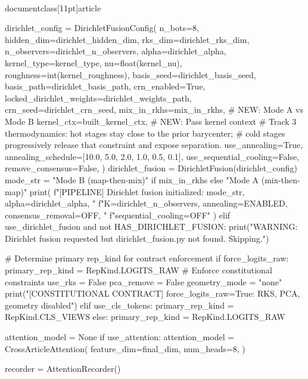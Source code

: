 \\documentclass[11pt]{article}
\begin{document}
\begin{CodeBlock}
        dirichlet_config = DirichletFusionConfig(
            n_bots=8,
            hidden_dim=dirichlet_hidden_dim,
            rks_dim=dirichlet_rks_dim,
            n_observers=dirichlet_n_observers,
            alpha=dirichlet_alpha,
            kernel_type=kernel_type,
            nu=float(kernel_nu),
            roughness=int(kernel_roughness),
            basis_seed=dirichlet_basis_seed,
            basis_path=dirichlet_basis_path,
            crn_enabled=True,
            locked_dirichlet_weights=dirichlet_weights_path,
            crn_seed=dirichlet_crn_seed,
            mix_in_rkhs=mix_in_rkhs,  # NEW: Mode A vs Mode B
            kernel_ctx=built_kernel_ctx,  # NEW: Pass kernel context
            # Track 3 thermodynamics: hot stages stay close to the prior barycenter;
            # cold stages progressively release that constraint and expose separation.
            use_annealing=True,
            annealing_schedule=[10.0, 5.0, 2.0, 1.0, 0.5, 0.1],
            use_sequential_cooling=False,
            remove_consensus=False,
        )
        dirichlet_fusion = DirichletFusion(dirichlet_config)
        mode_str = "Mode B (map-then-mix)" if mix_in_rkhs else "Mode A (mix-then-map)"
        print(
            f"[PIPELINE] Dirichlet fusion initialized: {mode_str}, alpha={dirichlet_alpha}, "
            f"K={dirichlet_n_observers}, annealing=ENABLED, consensus_removal=OFF, "
            f"sequential_cooling=OFF"
        )
    elif use_dirichlet_fusion and not HAS_DIRICHLET_FUSION:
        print("WARNING: Dirichlet fusion requested but dirichlet_fusion.py not found. Skipping.")

    # Determine primary rep_kind for contract enforcement
    if force_logits_raw:
        primary_rep_kind = RepKind.LOGITS_RAW
        # Enforce constitutional constraints
        use_rks = False
        pca_remove = False
        geometry_mode = "none"
        print("[CONSTITUTIONAL CONTRACT] force_logits_raw=True: RKS, PCA, geometry disabled")
    elif use_cls_tokens:
        primary_rep_kind = RepKind.CLS_VIEWS
    else:
        primary_rep_kind = RepKind.LOGITS_RAW

    attention_model = None
    if use_attention:
        attention_model = CrossArticleAttention(
            feature_dim=final_dim,
            num_heads=8,
        )

    recorder = AttentionRecorder()


\end{CodeBlock}
\end{document}
